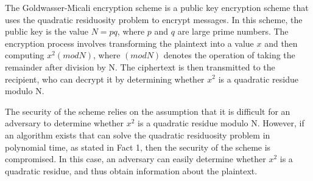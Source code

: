 



The Goldwasser-Micali encryption scheme is a public key encryption scheme that uses the quadratic 
residuosity problem to encrypt messages. In this scheme, the public key is the value $N = pq$, where $p$ and $q$ 
are large prime numbers. The encryption process involves transforming the plaintext into a value $x$ and then computing $x^2 (mod N)$, 
where $(mod N)$ denotes the operation of taking the remainder after division by N. 
The ciphertext is then transmitted to the recipient, who can decrypt it by determining whether $x^2$ is a quadratic residue modulo N.

The security of the scheme relies on the assumption that it is difficult for an adversary to determine whether $x^2$ 
is a quadratic residue modulo N. However, if an algorithm exists that can solve the quadratic residuosity problem in polynomial time,
as stated in Fact 1, then the security of the scheme is compromised. In this case, an adversary can easily determine whether $x^2$
is a quadratic residue, and thus obtain information about the plaintext.

